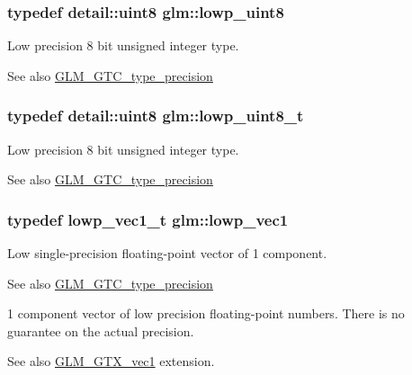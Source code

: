 \subsubsection[{\texorpdfstring{lowp\+\_\+uint8}{lowp_uint8}}]{\setlength{\rightskip}{0pt plus 5cm}typedef detail\+::uint8 {\bf glm\+::lowp\+\_\+uint8}}\hypertarget{group__gtc__type__precision_ga4d9dc08b7b248a386dfe9afd00fc6b1e}{}\label{group__gtc__type__precision_ga4d9dc08b7b248a386dfe9afd00fc6b1e}
Low precision 8 bit unsigned integer type. \begin{DoxySeeAlso}{See also}
\hyperlink{group__gtc__type__precision}{G\+L\+M\+\_\+\+G\+T\+C\+\_\+type\+\_\+precision} 
\end{DoxySeeAlso}
\subsubsection[{\texorpdfstring{lowp\+\_\+uint8\+\_\+t}{lowp_uint8_t}}]{\setlength{\rightskip}{0pt plus 5cm}typedef detail\+::uint8 {\bf glm\+::lowp\+\_\+uint8\+\_\+t}}\hypertarget{group__gtc__type__precision_ga0910ef24195d1b8b26e34d73148c0c45}{}\label{group__gtc__type__precision_ga0910ef24195d1b8b26e34d73148c0c45}
Low precision 8 bit unsigned integer type. \begin{DoxySeeAlso}{See also}
\hyperlink{group__gtc__type__precision}{G\+L\+M\+\_\+\+G\+T\+C\+\_\+type\+\_\+precision} 
\end{DoxySeeAlso}
\subsubsection[{\texorpdfstring{lowp\+\_\+vec1}{lowp_vec1}}]{\setlength{\rightskip}{0pt plus 5cm}typedef lowp\+\_\+vec1\+\_\+t {\bf glm\+::lowp\+\_\+vec1}}\hypertarget{group__gtc__type__precision_gae48c64f920be353ece773ff367f0161c}{}\label{group__gtc__type__precision_gae48c64f920be353ece773ff367f0161c}
Low single-\/precision floating-\/point vector of 1 component. \begin{DoxySeeAlso}{See also}
\hyperlink{group__gtc__type__precision}{G\+L\+M\+\_\+\+G\+T\+C\+\_\+type\+\_\+precision}
\end{DoxySeeAlso}
1 component vector of low precision floating-\/point numbers. There is no guarantee on the actual precision. \begin{DoxySeeAlso}{See also}
\hyperlink{group__gtx__vec1}{G\+L\+M\+\_\+\+G\+T\+X\+\_\+vec1} extension. 
\end{DoxySeeAlso}
